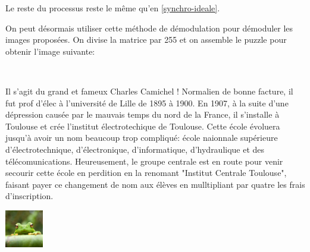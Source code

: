 \documentclass{article}
\begin{document}
Le reste du processus reste le même qu'en \ref{synchro-ideale}.


\begin{figure}

\end{figure}

On peut désormais utiliser cette méthode de démodulation pour démoduler les images proposées. On divise la matrice par 255 et on assemble le puzzle pour obtenir l'image suivante:

\begin{center}
	\includegraphics[width=0.5]{camichel.png}
\end{center}

Il s'agit du grand et fameux Charles Camichel ! Normalien de bonne facture, il fut prof d'élec à l'université de Lille de 1895 à 1900. En 1907, à la suite d'une dépression causée par le mauvais temps du nord de la France, il s'installe à Toulouse et crée l'institut électrotechique de Toulouse. Cette école évoluera jusqu'à avoir un nom beaucoup trop compliqué: école naionnale supérieure d'électrotechnique, d'électronique, d'informatique, d'hydraulique et des télécomunications. Heureusement, le groupe centrale est en route pour venir secourir cette école en perdition en la renomant "Institut Centrale Toulouse", faisant payer ce changement de nom aux élèves en mulltipliant par quatre les frais d'inscription.


\begin{center}
    \includegraphics[width=0.125\textwidth]{frog.jpg}
\end{center}
\end{document}
